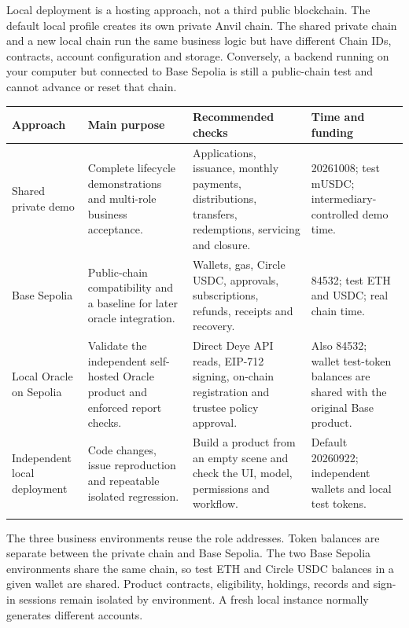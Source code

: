 \documentclass[12pt,a4paper]{article}
\begin{document}
Local deployment is a hosting approach, not a third public blockchain. The default local profile creates its own private Anvil chain. The shared private chain and a new local chain run the same business logic but have different Chain IDs, contracts, account configuration and storage. Conversely, a backend running on your computer but connected to Base Sepolia is still a public-chain test and cannot advance or reset that chain.

\begin{longtable}{L{2.5cm}L{4.2cm}L{4.5cm}L{3cm}}\toprule Approach & Main purpose & Recommended checks & Time and funding\\\midrule\endhead
Shared private demo & Complete lifecycle demonstrations and multi-role business acceptance. & Applications, issuance, monthly payments, distributions, transfers, redemptions, servicing and closure. & 20261008; test mUSDC; intermediary-controlled demo time.\\\addlinespace
Base Sepolia & Public-chain compatibility and a baseline for later oracle integration. & Wallets, gas, Circle USDC, approvals, subscriptions, refunds, receipts and recovery. & 84532; test ETH and USDC; real chain time.\\\addlinespace
Local Oracle on Sepolia & Validate the independent self-hosted Oracle product and enforced report checks. & Direct Deye API reads, EIP-712 signing, on-chain registration and trustee policy approval. & Also 84532; wallet test-token balances are shared with the original Base product.\\\addlinespace
Independent local deployment & Code changes, issue reproduction and repeatable isolated regression. & Build a product from an empty scene and check the UI, model, permissions and workflow. & Default 20260922; independent wallets and local test tokens.\\\addlinespace
\bottomrule\end{longtable}
The three business environments reuse the role addresses. Token balances are separate between the private chain and Base Sepolia. The two Base Sepolia environments share the same chain, so test ETH and Circle USDC balances in a given wallet are shared. Product contracts, eligibility, holdings, records and sign-in sessions remain isolated by environment. A fresh local instance normally generates different accounts.

\clearpage
\end{document}
